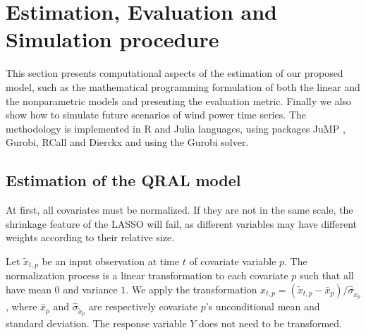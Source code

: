 \section{Estimation, Evaluation and Simulation procedure} \label{sec:estimation-evaluation-simulation}

This section presents computational aspects of the estimation of our proposed model, such as the mathematical programming formulation of both the linear and the nonparametric models and presenting the evaluation metric. 
Finally we also show how to simulate future scenarios of wind power time series.
The methodology is implemented in R \cite{rlanguage2008} and Julia \cite{bezanson2012julia} languages, using  packages JuMP \cite{DunningHuchetteLubin2017}, Gurobi, RCall and Dierckx and using the Gurobi solver. 



\subsection{Estimation of the QRAL model} \label{sec:qral-estimation}

At first, all covariates must be normalized. 
If they are not in the same scale, the shrinkage feature of the LASSO will fail, as different variables may have different weights according to their relative size.

Let $\tilde x_{t,p}$ be an input observation at time $t$ of covariate variable $p$.
The normalization process is a linear transformation to each covariate $p$ such that all have mean $0$ and variance $1$. 
We apply the transformation ${x}_{t,p} = (\tilde x_{t,p} - \bar{x}_{p}) / \hat\sigma_{\tilde x_{p}}$, where $\bar{x}_{p}$ and $\hat{\sigma}_{\tilde x_{p}}$ are respectively covariate $p$'s unconditional mean and standard deviation. The response variable $Y$ does not need to be transformed.

